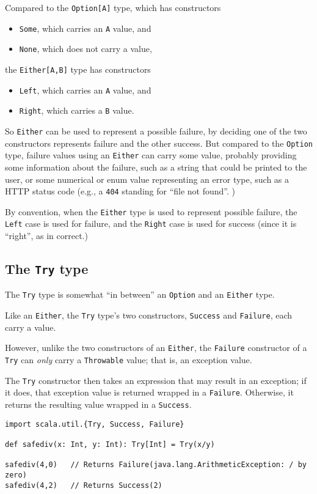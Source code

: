 \documentclass[11pt]{article}
\begin{document}
Compared to the \texttt{Option[A]} type, which has constructors
\begin{itemize}
\item \texttt{Some}, which carries an \texttt{A} value, and
\item \texttt{None}, which does not carry a value,
\end{itemize}
the \texttt{Either[A,B]} type has constructors
\begin{itemize}
\item \texttt{Left}, which carries an \texttt{A} value, and
\item \texttt{Right}, which carries a \texttt{B} value.
\end{itemize}

So \texttt{Either} can be used to represent a possible failure,
by deciding one of the two constructors represents failure
and the other success.
But compared to the \texttt{Option} type, failure values using
an \texttt{Either} can carry some value, probably providing
some information about the failure, such as
a string that could be printed to the user,
or some numerical or enum value representing an error type,
such as a HTTP status code (e.g., a \texttt{404} standing for “file not found”. )

By convention, when the \texttt{Either} type is used to represent
possible failure, the \texttt{Left} case is used for failure,
and the \texttt{Right} case is used for success (since it is “right”,
as in correct.)

\subsection{The \texttt{Try} type}
\label{sec:orgb7569e1}
The \texttt{Try} type is somewhat “in between” an \texttt{Option} and an \texttt{Either} type.

Like an \texttt{Either}, the \texttt{Try} type's two constructors, \texttt{Success} and \texttt{Failure},
each carry a value.

However, unlike the two constructors of an \texttt{Either},
the \texttt{Failure} constructor of a \texttt{Try} can \emph{only} carry a \texttt{Throwable} value;
that is, an exception value.

The \texttt{Try} constructor then takes an expression that
may result in an exception; if it does, that exception value
is returned wrapped in a \texttt{Failure}. Otherwise, it returns
the resulting value wrapped in a \texttt{Success}.
\begin{verbatim}
import scala.util.{Try, Success, Failure}

def safediv(x: Int, y: Int): Try[Int] = Try(x/y)

safediv(4,0)   // Returns Failure(java.lang.ArithmeticException: / by zero)
safediv(4,2)   // Returns Success(2)
\end{verbatim}
\end{document}
